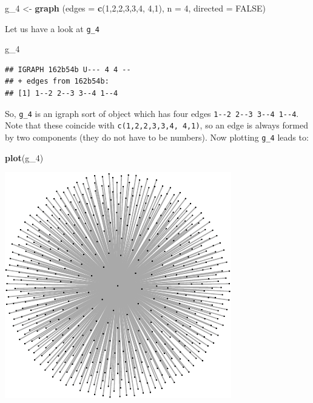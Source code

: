 \documentclass[]{article}
\newenvironment{Shaded}{\begin{snugshade}}{\end{snugshade}}
\newcommand{\KeywordTok}[1]{\textcolor[rgb]{0.13,0.29,0.53}{\textbf{#1}}}
\newcommand{\DataTypeTok}[1]{\textcolor[rgb]{0.13,0.29,0.53}{#1}}
\newcommand{\DecValTok}[1]{\textcolor[rgb]{0.00,0.00,0.81}{#1}}
\newcommand{\StringTok}[1]{\textcolor[rgb]{0.31,0.60,0.02}{#1}}
\newcommand{\OtherTok}[1]{\textcolor[rgb]{0.56,0.35,0.01}{#1}}
\newcommand{\NormalTok}[1]{#1}
\theoremstyle{definition}
\theoremstyle{definition}
\theoremstyle{definition}
\theoremstyle{remark}
\begin{document}
\begin{Shaded}
\begin{Highlighting}[]
\NormalTok{g_}\DecValTok{4}\NormalTok{ <-}\StringTok{ }\KeywordTok{graph}\NormalTok{ (}\DataTypeTok{edges =} \KeywordTok{c}\NormalTok{(}\DecValTok{1}\NormalTok{,}\DecValTok{2}\NormalTok{,}\DecValTok{2}\NormalTok{,}\DecValTok{3}\NormalTok{,}\DecValTok{3}\NormalTok{,}\DecValTok{4}\NormalTok{, }\DecValTok{4}\NormalTok{,}\DecValTok{1}\NormalTok{), }\DataTypeTok{n =} \DecValTok{4}\NormalTok{, }\DataTypeTok{directed =} \OtherTok{FALSE}\NormalTok{)}
\end{Highlighting}
\end{Shaded}

Let us have a look at \texttt{g\_4}

\begin{Shaded}
\begin{Highlighting}[]
\NormalTok{g_}\DecValTok{4}
\end{Highlighting}
\end{Shaded}

\begin{verbatim}
## IGRAPH 162b54b U--- 4 4 -- 
## + edges from 162b54b:
## [1] 1--2 2--3 3--4 1--4
\end{verbatim}

So, \texttt{g\_4} is an igraph sort of object which has four edges
\texttt{1-\/-2\ 2-\/-3\ 3-\/-4\ 1-\/-4}. Note that these coincide with
\texttt{c(1,2,2,3,3,4,\ 4,1)}, so an edge is always formed by two
components (they do not have to be numbers). Now plotting \texttt{g\_4}
leads to:

\begin{Shaded}
\begin{Highlighting}[]
\KeywordTok{plot}\NormalTok{(g_}\DecValTok{4}\NormalTok{)}
\end{Highlighting}
\end{Shaded}

\includegraphics{ResearchTools_files/figure-latex/unnamed-chunk-51-1.pdf}
\end{document}
